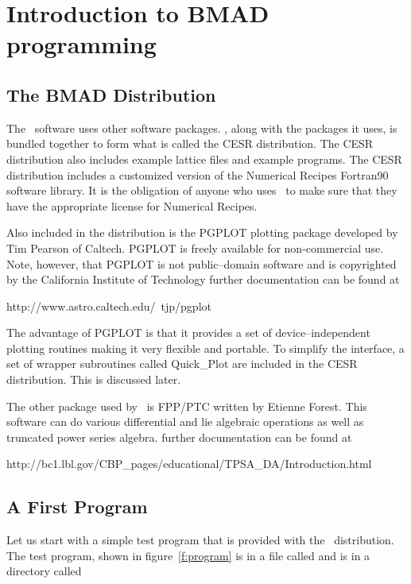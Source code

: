 \chapter{Introduction to BMAD programming}

\section{The BMAD Distribution}

The \bmad\ software uses other software packages. \bmad, along with
the packages it uses, is bundled together to form what is called the
CESR distribution. The CESR distribution also includes example lattice
files and example programs. The CESR distribution includes a
customized version of the Numerical Recipes Fortran90 software
library\cite{b:nr}. It is the obligation of anyone who uses \bmad\ to
make sure that they have the appropriate license for Numerical
Recipes.

Also included in the distribution is the PGPLOT plotting package
developed by Tim Pearson of Caltech.  PGPLOT is freely available for
non-commercial use. Note, however, that PGPLOT is not public--domain
software and is copyrighted by the California Institute of Technology
further documentation can be found at
\begin{example}
    http://www.astro.caltech.edu/~tjp/pgplot
\end{example}
The advantage of PGPLOT is that it provides a set of
device--independent plotting routines making it very flexible and
portable. To simplify the interface, a set of wrapper subroutines
called Quick\_Plot are included in the CESR distribution. This is
discussed later.

The other package used by \bmad\ is FPP/PTC written by Etienne
Forest. This software can do various differential and lie algebraic
operations as well as truncated power series algebra. further
documentation can be found at
\begin{example}
    http://bc1.lbl.gov/CBP_pages/educational/TPSA_DA/Introduction.html
\end{example}

\section{A First Program}

Let us start with a simple test program that is provided with the
\bmad\ distribution. The test program, shown in figure~\ref{f:program}
is in a file called
 and is in a directory called 

